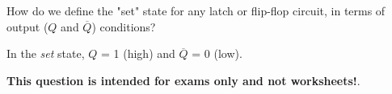 

How do we define the "set" state for any latch or flip-flop circuit, in terms of output ($Q$ and $\overline{Q}$) conditions?







In the {\it set} state, $Q$ = 1 (high) and $\overline{Q}$ = 0 (low).







{\bf This question is intended for exams only and not worksheets!}.




